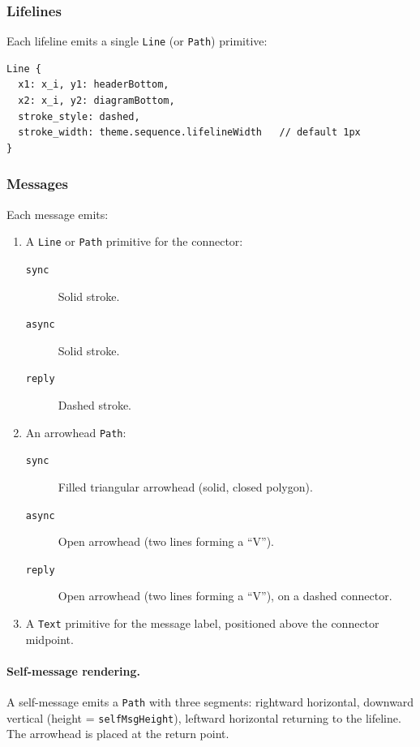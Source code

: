 \subsubsection{Lifelines}

Each lifeline emits a single \texttt{Line} (or \texttt{Path}) primitive:
\begin{Verbatim}[frame=single,fontsize=\small]
Line {
  x1: x_i, y1: headerBottom,
  x2: x_i, y2: diagramBottom,
  stroke_style: dashed,
  stroke_width: theme.sequence.lifelineWidth   // default 1px
}
\end{Verbatim}

\subsubsection{Messages}

Each message emits:
\begin{enumerate}
  \item A \texttt{Line} or \texttt{Path} primitive for the connector:
    \begin{description}
      \item[\texttt{sync}] Solid stroke.
      \item[\texttt{async}] Solid stroke.
      \item[\texttt{reply}] Dashed stroke.
    \end{description}
  \item An arrowhead \texttt{Path}:
    \begin{description}
      \item[\texttt{sync}] Filled triangular arrowhead (solid, closed polygon).
      \item[\texttt{async}] Open arrowhead (two lines forming a ``V'').
      \item[\texttt{reply}] Open arrowhead (two lines forming a ``V''), on a dashed connector.
    \end{description}
  \item A \texttt{Text} primitive for the message label, positioned above the connector midpoint.
\end{enumerate}

\paragraph{Self-message rendering.}
A self-message emits a \texttt{Path} with three segments: rightward horizontal, downward vertical (height = \texttt{selfMsgHeight}), leftward horizontal returning to the lifeline. The arrowhead is placed at the return point.

